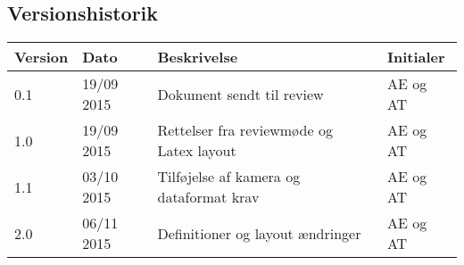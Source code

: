 \subsection{Versionshistorik}

\begin{center}
		\begin{longtable}{ | m{1.5cm}| m{2cm}| m{7cm}| m{2cm}| } 
			\hline
			\textbf{Version} & \textbf{Dato}  & \textbf{Beskrivelse} & \textbf{Initialer}  \\ 
			\hline
			0.1 &  19/09 2015  & Dokument sendt til review & AE og AT \\
			\hline
			1.0  &  19/09 2015 & Rettelser fra reviewmøde og Latex layout & AE og AT \\
			\hline
			1.1  &  03/10 2015 &  Tilføjelse af kamera og dataformat krav & AE og AT \\
			\hline
			2.0  &  06/11 2015  & Definitioner og layout ændringer & AE og AT \\
			\hline
		\end{longtable}
		
	\end{center}
	\pagebreak